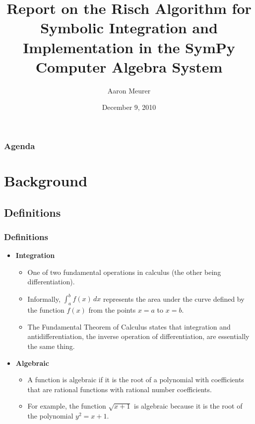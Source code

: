 \documentclass{beamer}
\title{Report on the Risch Algorithm for Symbolic
Integration and Implementation in the SymPy Computer Algebra System}
\author{Aaron Meurer}
\date{December 9, 2010}
\numberwithin{equation}{section} %
\begin{document}
\begin{frame}
    \titlepage
\end{frame}

\begin{frame} 
    \frametitle{Agenda} 
    \tableofcontents 
\end{frame} 

\section{Background}
\subsection{Definitions}

\begin{frame}
    \frametitle{Definitions}
    \begin{itemize}
        \item {\bf Integration} 
        \begin{itemize}
            \item One of two fundamental operations in calculus (the other
            being differentiation).
            \item Informally, $\int_a^b{f(x)\,dx}$ represents the area under
            the curve defined by the function $f(x)$ from the points $x=a$
            to $x=b$.
            \item The Fundamental Theorem of Calculus states that
            integration and antidifferentiation, the inverse operation of
            differentiation, are essentially the same thing.
            \end{itemize}
    \pause
        \item {\bf Algebraic}
        \begin{itemize}
            \item A function is algebraic if it is the root of a polynomial
            with coefficients that are rational functions with rational
            number coefficients.  
            \item For example, the function $\sqrt{x + 1}$ is algebraic
            because it is the root of the polynomial $y^2 = x + 1$. 
        \end{itemize}
    \end{itemize}
\end{frame}
\end{document}
